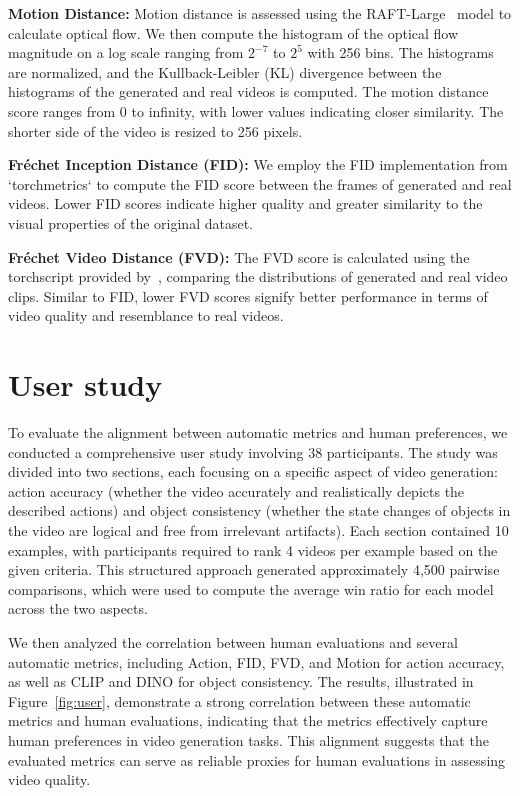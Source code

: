 \textbf{Motion Distance:} Motion distance is assessed using the RAFT-Large~\cite{raft} model to calculate optical flow. We then compute the histogram of the optical flow magnitude on a log scale ranging from \(2^{-7}\) to \(2^5\) with 256 bins. The histograms are normalized, and the Kullback-Leibler (KL) divergence between the histograms of the generated and real videos is computed. The motion distance score ranges from 0 to infinity, with lower values indicating closer similarity. The shorter side of the video is resized to 256 pixels.

\textbf{Fréchet Inception Distance (FID):} We employ the FID implementation from `torchmetrics` to compute the FID score between the frames of generated and real videos. Lower FID scores indicate higher quality and greater similarity to the visual properties of the original dataset.

\textbf{Fréchet Video Distance (FVD):} The FVD score is calculated using the torchscript provided by~\cite{StyleGAN}, comparing the distributions of generated and real video clips. Similar to FID, lower FVD scores signify better performance in terms of video quality and resemblance to real videos.

\section{User study}
\label{user study}
To evaluate the alignment between automatic metrics and human preferences, we conducted a comprehensive user study involving 38 participants. The study was divided into two sections, each focusing on a specific aspect of video generation: action accuracy (whether the video accurately and realistically depicts the described actions) and object consistency (whether the state changes of objects in the video are logical and free from irrelevant artifacts). Each section contained 10 examples, with participants required to rank 4 videos per example based on the given criteria. This structured approach generated approximately 4,500 pairwise comparisons, which were used to compute the average win ratio for each model across the two aspects. 

We then analyzed the correlation between human evaluations and several automatic metrics, including Action, FID, FVD, and Motion for action accuracy, as well as CLIP and DINO for object consistency. The results, illustrated in Figure~\ref{fig:user}, demonstrate a strong correlation between these automatic metrics and human evaluations, indicating that the metrics effectively capture human preferences in video generation tasks. This alignment suggests that the evaluated metrics can serve as reliable proxies for human evaluations in assessing video quality.

